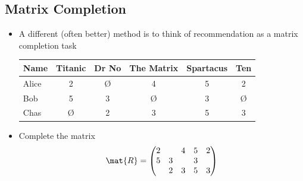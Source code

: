 \begin{slide}
\section[-1]{Matrix Completion}

\begin{PauseHighLight}
  \begin{itemize}
  \item A different (often better) method is to think of recommendation
    as a matrix completion task
    \begin{center}
    \begin{tabular}{|l||c|c|c|c|c|}\hline
      Name & Titanic & Dr No & The Matrix & Spartacus & Ten \\ \hline
      Alice & 2 & \O & 4  & 5 & 2  \\ \hline
      Bob   & 5 & 3  & \O & 3 & \O \\ \hline
      Chas  & \O & 2 & 3 & 5 & 3 \\ \hline
    \end{tabular}\pause
    \end{center}
  \item Complete the matrix
    \begin{align*} \mat{R} =
      \begin{pmatrix}
        2& & 4 & 5 & 2  \\
        5 & 3  &   & 3 &   \\
          & 2 & 3 & 5 & 3
      \end{pmatrix}
    \end{align*}\pause
  \end{itemize}
\end{PauseHighLight}

\end{slide}


